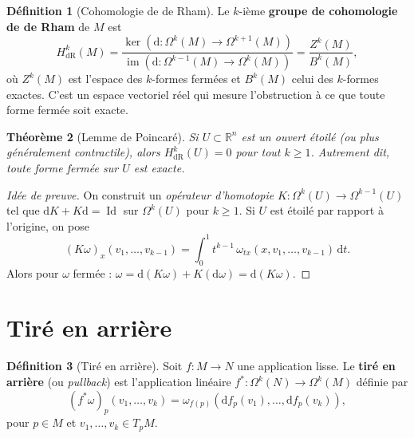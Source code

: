 \documentclass[12pt,a4paper,openany]{book}
\theoremstyle{definition}
\newtheorem{definition}{Définition}[chapter]
\theoremstyle{plain}
\newtheorem{theoreme}[definition]{Théorème}
\theoremstyle{remark}
\newcommand{\R}{\mathbb{R}}
\DeclareMathOperator{\Id}{Id}
\DeclareMathOperator{\im}{im}
\newcommand{\dd}{\mathrm{d}}
\begin{document}
\begin{definition}[Cohomologie de de Rham]\label{def:cohomologie-de-rham}%
Le $k$-ième \textbf{groupe de cohomologie de de Rham} de $M$ est
\[
  H^k_{\mathrm{dR}}(M) =
    \frac{\ker(\dd \colon \Omega^k(M) \to \Omega^{k+1}(M))}
         {\im(\dd \colon \Omega^{k-1}(M) \to \Omega^k(M))}
    = \frac{Z^k(M)}{B^k(M)},
\]
où $Z^k(M)$ est l'espace des $k$-formes fermées et $B^k(M)$ celui des
$k$-formes exactes. C'est un espace vectoriel réel qui mesure
l'obstruction à ce que toute forme fermée soit exacte.
\end{definition}

\begin{theoreme}[Lemme de Poincaré]\label{thm:lemme-poincare}%
Si $U \subset \R^n$ est un ouvert étoilé (ou plus généralement
contractile), alors $H^k_{\mathrm{dR}}(U) = 0$ pour tout $k \geq 1$.
Autrement dit, toute forme fermée sur $U$ est exacte.
\end{theoreme}

\begin{proof}[Idée de preuve]
On construit un \emph{opérateur d'homotopie}
$K \colon \Omega^k(U) \to \Omega^{k-1}(U)$ tel que
$\dd K + K \dd = \Id$ sur $\Omega^k(U)$ pour $k \geq 1$. Si $U$ est
étoilé par rapport à l'origine, on pose
\[
  (K\omega)_x(v_1, \ldots, v_{k-1}) = \int_0^1 t^{k-1}\,
    \omega_{tx}(x, v_1, \ldots, v_{k-1})\, \dd t.
\]
Alors pour $\omega$ fermée : $\omega = \dd(K\omega) + K(\dd\omega)
= \dd(K\omega)$.
\end{proof}

\section{Tiré en arrière}\label{sec:tire-en-arriere}

\begin{definition}[Tiré en arrière]\label{def:tire-en-arriere}%
Soit $f \colon M \to N$ une application lisse. Le \textbf{tiré en arrière}
(ou \textit{pullback}) est l'application linéaire
$f^* \colon \Omega^k(N) \to \Omega^k(M)$ définie par
\[
  (f^*\omega)_p(v_1, \ldots, v_k) = \omega_{f(p)}(\dd f_p(v_1),
    \ldots, \dd f_p(v_k)),
\]
pour $p \in M$ et $v_1, \ldots, v_k \in T_p M$.
\end{definition}
\end{document}

